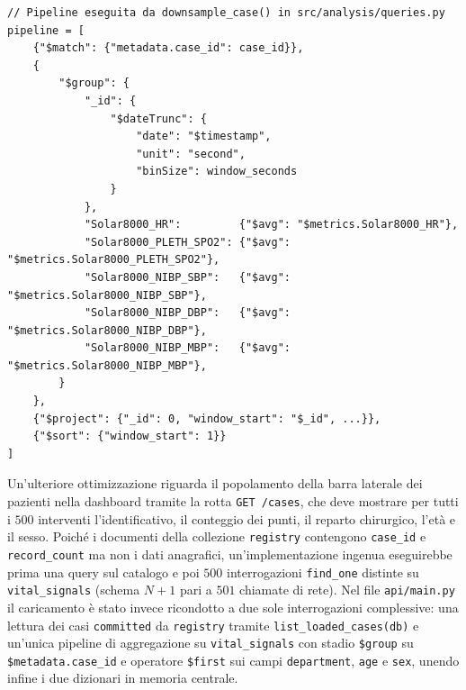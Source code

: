 \vspace{4pt}
\noindent\begin{minipage}{\textwidth}
\begin{lstlisting}
// Pipeline eseguita da downsample_case() in src/analysis/queries.py
pipeline = [
    {"$match": {"metadata.case_id": case_id}},
    {
        "$group": {
            "_id": {
                "$dateTrunc": {
                    "date": "$timestamp",
                    "unit": "second",
                    "binSize": window_seconds
                }
            },
            "Solar8000_HR":         {"$avg": "$metrics.Solar8000_HR"},
            "Solar8000_PLETH_SPO2": {"$avg": "$metrics.Solar8000_PLETH_SPO2"},
            "Solar8000_NIBP_SBP":   {"$avg": "$metrics.Solar8000_NIBP_SBP"},
            "Solar8000_NIBP_DBP":   {"$avg": "$metrics.Solar8000_NIBP_DBP"},
            "Solar8000_NIBP_MBP":   {"$avg": "$metrics.Solar8000_NIBP_MBP"},
        }
    },
    {"$project": {"_id": 0, "window_start": "$_id", ...}},
    {"$sort": {"window_start": 1}}
]
\end{lstlisting}
\label{lst:downsample_pipeline}
\end{minipage}
\vspace{8pt}

Un'ulteriore ottimizzazione riguarda il popolamento della barra laterale dei pazienti nella dashboard tramite la rotta \texttt{GET /cases}, che deve mostrare per tutti i $500$ interventi l'identificativo, il conteggio dei punti, il reparto chirurgico, l'et\`a e il sesso. Poich\'e i documenti della collezione \texttt{registry} contengono \texttt{case\_id} e \texttt{record\_count} ma non i dati anagrafici, un'implementazione ingenua eseguirebbe prima una query sul catalogo e poi $500$ interrogazioni \texttt{find\_one} distinte su \texttt{vital\_signals} (schema $N+1$ pari a $501$ chiamate di rete). Nel file \texttt{api/main.py} il caricamento \`e stato invece ricondotto a due sole interrogazioni complessive: una lettura dei casi \texttt{committed} da \texttt{registry} tramite \texttt{list\_loaded\_cases(db)} e un'unica pipeline di aggregazione su \texttt{vital\_signals} con stadio \texttt{\$group} su \texttt{\$metadata.case\_id} e operatore \texttt{\$first} sui campi \texttt{department}, \texttt{age} e \texttt{sex}, unendo infine i due dizionari in memoria centrale.
